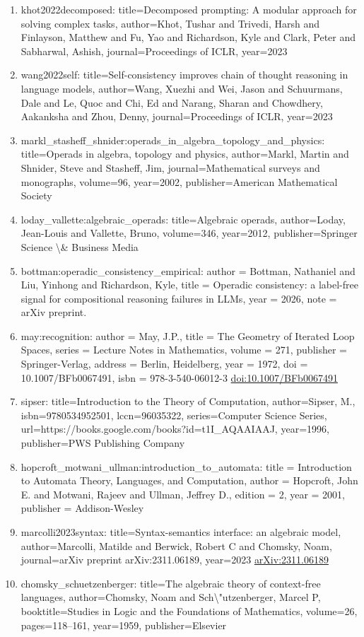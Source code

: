 \documentclass[11pt]{article}
\begin{document}
\begin{enumerate}[leftmargin=*]
  \item khot2022decomposed: title=Decomposed prompting: A modular approach for solving complex tasks, author=Khot, Tushar and Trivedi, Harsh and Finlayson, Matthew and Fu, Yao and Richardson, Kyle and Clark, Peter and Sabharwal, Ashish, journal=Proceedings of ICLR, year=2023
  \item wang2022self: title=Self-consistency improves chain of thought reasoning in language models, author=Wang, Xuezhi and Wei, Jason and Schuurmans, Dale and Le, Quoc and Chi, Ed and Narang, Sharan and Chowdhery, Aakanksha and Zhou, Denny, journal=Proceedings of ICLR, year=2023
  \item markl\_stasheff\_shnider:operads\_in\_algebra\_topology\_and\_physics: title=Operads in algebra, topology and physics, author=Markl, Martin and Shnider, Steve and Stasheff, Jim, journal=Mathematical surveys and monographs, volume=96, year=2002, publisher=American Mathematical Society
  \item loday\_vallette:algebraic\_operads: title=Algebraic operads, author=Loday, Jean-Louis and Vallette, Bruno, volume=346, year=2012, publisher=Springer Science \textbackslash{}\& Business Media
  \item bottman:operadic\_consistency\_empirical: author = Bottman, Nathaniel and Liu, Yinhong and Richardson, Kyle, title = Operadic consistency: a label-free signal for compositional reasoning failures in LLMs, year = 2026, note = arXiv preprint.
  \item may:recognition: author = May, J.P., title = The Geometry of Iterated Loop Spaces, series = Lecture Notes in Mathematics, volume = 271, publisher = Springer-Verlag, address = Berlin, Heidelberg, year = 1972, doi = 10.1007/BFb0067491, isbn = 978-3-540-06012-3 \href{https://doi.org/10.1007/BFb0067491}{doi:10.1007/BFb0067491}
  \item sipser: title=Introduction to the Theory of Computation, author=Sipser, M., isbn=9780534952501, lccn=96035322, series=Computer Science Series, url=https://books.google.com/books?id=t1I\_AQAAIAAJ, year=1996, publisher=PWS Publishing Company
  \item hopcroft\_motwani\_ullman:introduction\_to\_automata: title = Introduction to Automata Theory, Languages, and Computation, author = Hopcroft, John E. and Motwani, Rajeev and Ullman, Jeffrey D., edition = 2, year = 2001, publisher = Addison-Wesley
  \item marcolli2023syntax: title=Syntax-semantics interface: an algebraic model, author=Marcolli, Matilde and Berwick, Robert C and Chomsky, Noam, journal=arXiv preprint arXiv:2311.06189, year=2023 \href{https://arxiv.org/abs/2311.06189}{arXiv:2311.06189}
  \item chomsky\_schuetzenberger: title=The algebraic theory of context-free languages, author=Chomsky, Noam and Sch\textbackslash{}"utzenberger, Marcel P, booktitle=Studies in Logic and the Foundations of Mathematics, volume=26, pages=118--161, year=1959, publisher=Elsevier
\end{enumerate}

% 
% 
\end{document}
